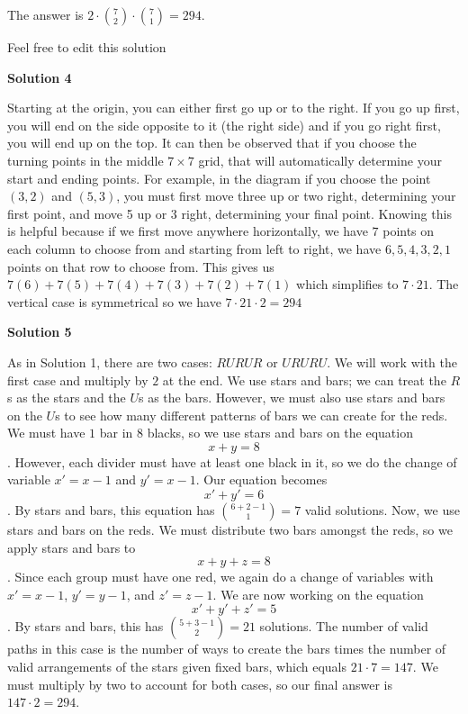 \begin{enumerate}
 The answer is $2\cdot {7 \choose 2} \cdot {7 \choose 1} = \boxed{294}$.

 Feel free to edit this solution

 



\textbf{Solution 4}

Starting at the origin, you can either first go up or to the right. If you go up first, you will end on the side opposite to it (the right side) and if you go right first, you will end up on the top. It can then be observed that if you choose the turning points in the middle $7 \times 7$ grid, that will automatically determine your start and ending points. For example, in the diagram if you choose the point $(3,2)$ and $(5,3)$, you must first move three up or two right, determining your first point, and move 5 up or 3 right, determining your final point. Knowing this is helpful because if we first move anywhere horizontally, we have $7$ points on each column to choose from and starting from left to right, we have $6,5,4,3,2,1$ points on that row to choose from. This gives us $7(6)+7(5)+7(4)+7(3)+7(2)+7(1)$ which simplifies to $7\cdot21$. The vertical case is symmetrical so we have $7\cdot21\cdot2 = \boxed{294}$




\textbf{Solution 5}

As in Solution 1, there are two cases: $RURUR$ or $URURU$. We will work with the first case and multiply by $2$ at the end. We use stars and bars; we can treat the $R$s as the stars and the $U$s as the bars. However, we must also use stars and bars on the $U$s to see how many different patterns of bars we can create for the reds. We must have $1$ bar in $8$ blacks, so we use stars and bars on the equation 
 \[x + y = 8\]. However, each divider must have at least one black in it, so we do the change of variable $x' = x-1$ and $y' = x-1$. Our equation becomes 
 \[x' + y' = 6\]. By stars and bars, this equation has $\binom{6 + 2 - 1}{1} = 7$ valid solutions. Now, we use stars and bars on the reds. We must distribute two bars amongst the reds, so we apply stars and bars to 
 \[x + y + z = 8\]. Since each group must have one red, we again do a change of variables with $x' = x-1$, $y' = y-1$, and $z' = z-1$. We are now working on the equation 
 \[x' + y' + z' = 5\]. By stars and bars, this has $\binom{5 + 3 - 1}{2} = 21$ solutions. The number of valid paths in this case is the number of ways to create the bars times the number of valid arrangements of the stars given fixed bars, which equals $21 \cdot 7 = 147$. We must multiply by two to account for both cases, so our final answer is $147 \cdot 2 = \boxed{294}$.


\end{enumerate}
